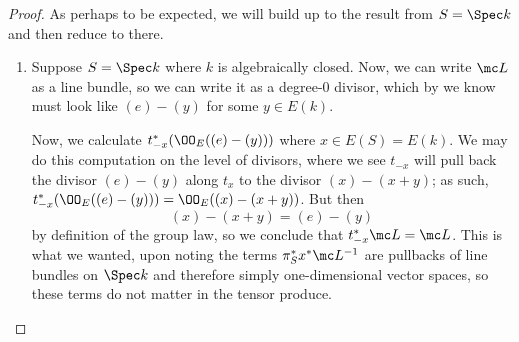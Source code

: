 \documentclass[../notes.tex]{subfiles}
\begin{document}
\begin{proof}
	As perhaps to be expected, we will build up to the result from $S=\Spec k$ and then reduce to there.
	\begin{enumerate}
		\item Suppose $S=\Spec k$ where $k$ is algebraically closed. Now, we can write $\mc L$ as a line bundle, so we can write it as a degree-$0$ divisor, which by  we know must look like $(e)-(y)$ for some $y\in E(k)$.

		Now, we calculate $t_{-x}^*(\OO_E((e)-(y)))$ where $x\in E(S)=E(k)$. We may do this computation on the level of divisors, where we see $t_{-x}$ will pull back the divisor $(e)-(y)$ along $t_x$ to the divisor $(x)-(x+y)$; as such, $t_{-x}^*(\OO_E((e)-(y)))=\OO_E((x)-(x+y))$. But then
		\[(x)-(x+y)=(e)-(y)\]
		by definition of the group law, so we conclude that $t_{-x}^*\mc L=\mc L$. This is what we wanted, upon noting the terms $\pi_S^*x^*\mc L^{-1}$ are pullbacks of line bundles on $\Spec k$ and therefore simply one-dimensional vector spaces, so these terms do not matter in the tensor produce.


\end{enumerate}
\end{proof}
\end{document}
